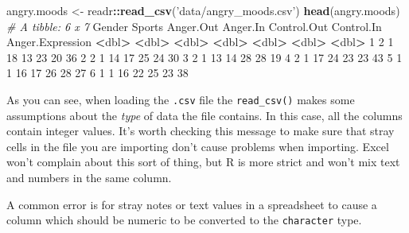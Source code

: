 \documentclass[]{article}
\newenvironment{Shaded}{\begin{snugshade}}{\end{snugshade}}
\newcommand{\CommentTok}[1]{\textcolor[rgb]{0.56,0.35,0.01}{\textit{#1}}}
\newcommand{\DecValTok}[1]{\textcolor[rgb]{0.00,0.00,0.81}{#1}}
\newcommand{\ErrorTok}[1]{\textcolor[rgb]{0.64,0.00,0.00}{\textbf{#1}}}
\newcommand{\KeywordTok}[1]{\textcolor[rgb]{0.13,0.29,0.53}{\textbf{#1}}}
\newcommand{\NormalTok}[1]{#1}
\newcommand{\OperatorTok}[1]{\textcolor[rgb]{0.81,0.36,0.00}{\textbf{#1}}}
\newcommand{\StringTok}[1]{\textcolor[rgb]{0.31,0.60,0.02}{#1}}
\begin{document}
\begin{Shaded}
\begin{Highlighting}[]
\NormalTok{angry.moods <-}\StringTok{ }\NormalTok{readr}\OperatorTok{::}\KeywordTok{read_csv}\NormalTok{(}\StringTok{'data/angry_moods.csv'}\NormalTok{)}
\KeywordTok{head}\NormalTok{(angry.moods)}
\CommentTok{# A tibble: 6 x 7}
\NormalTok{  Gender Sports Anger.Out Anger.In Control.Out Control.In Anger.Expression}
   \OperatorTok{<}\NormalTok{dbl}\OperatorTok{>}\StringTok{  }\ErrorTok{<}\NormalTok{dbl}\OperatorTok{>}\StringTok{     }\ErrorTok{<}\NormalTok{dbl}\OperatorTok{>}\StringTok{    }\ErrorTok{<}\NormalTok{dbl}\OperatorTok{>}\StringTok{       }\ErrorTok{<}\NormalTok{dbl}\OperatorTok{>}\StringTok{      }\ErrorTok{<}\NormalTok{dbl}\OperatorTok{>}\StringTok{            }\ErrorTok{<}\NormalTok{dbl}\OperatorTok{>}
\DecValTok{1}      \DecValTok{2}      \DecValTok{1}        \DecValTok{18}       \DecValTok{13}          \DecValTok{23}         \DecValTok{20}               \DecValTok{36}
\DecValTok{2}      \DecValTok{2}      \DecValTok{1}        \DecValTok{14}       \DecValTok{17}          \DecValTok{25}         \DecValTok{24}               \DecValTok{30}
\DecValTok{3}      \DecValTok{2}      \DecValTok{1}        \DecValTok{13}       \DecValTok{14}          \DecValTok{28}         \DecValTok{28}               \DecValTok{19}
\DecValTok{4}      \DecValTok{2}      \DecValTok{1}        \DecValTok{17}       \DecValTok{24}          \DecValTok{23}         \DecValTok{23}               \DecValTok{43}
\DecValTok{5}      \DecValTok{1}      \DecValTok{1}        \DecValTok{16}       \DecValTok{17}          \DecValTok{26}         \DecValTok{28}               \DecValTok{27}
\DecValTok{6}      \DecValTok{1}      \DecValTok{1}        \DecValTok{16}       \DecValTok{22}          \DecValTok{25}         \DecValTok{23}               \DecValTok{38}
\end{Highlighting}
\end{Shaded}

As you can see, when loading the \texttt{.csv} file the \texttt{read\_csv()} makes some
assumptions about the \emph{type} of data the file contains. In this case, all the
columns contain integer values. It's worth checking this message to make sure
that stray cells in the file you are importing don't cause problems when
importing. Excel won't complain about this sort of thing, but R is more strict
and won't mix text and numbers in the same column.

A common error is for stray notes or text values in a spreadsheet to cause a
column which should be numeric to be converted to the \texttt{character} type.
\end{document}
